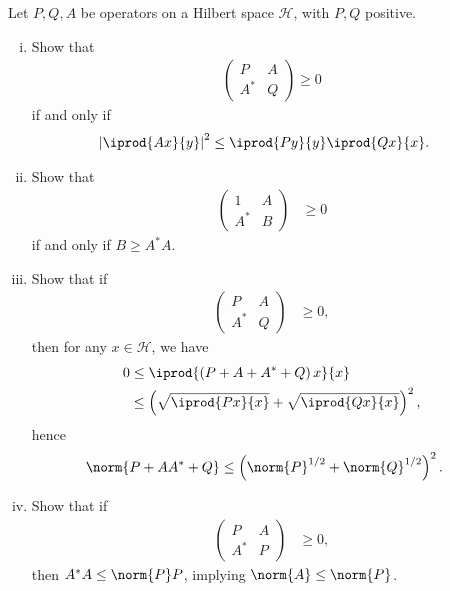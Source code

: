 \documentclass[10pt]{mypackage}
\begin{document}
\begin{exercise}[Exercise 3.2]
  Let $P,Q,A$ be operators on a Hilbert space $\mathcal{H}$, with $P,Q$ positive.
  \begin{enumerate}[(i)]
    \item Show that
      \begin{align*}
        \begin{pmatrix}P & A \\ A^{\ast} & Q\end{pmatrix}\geq 0
      \end{align*}
      if and only if
      \begin{align*}
        \left\vert \iprod{Ax}{y} \right\vert^2 &\leq \iprod{Py}{y} \iprod{Qx}{x}.
      \end{align*}
    \item Show that
      \begin{align*}
        \begin{pmatrix}1 & A \\ A^{\ast} & B\end{pmatrix} &\geq 0
      \end{align*}
      if and only if $B\geq A^{\ast}A$.
    \item Show that if
      \begin{align*}
        \begin{pmatrix}P & A \\ A^{\ast} & Q\end{pmatrix} &\geq 0,
      \end{align*}
      then for any $x\in \mathcal{H}$, we have
      \begin{align*}
        0 &\leq \iprod{\left( P + A + A^{\ast} + Q \right)x}{x}\\
          &\leq \left( \sqrt{ \iprod{Px}{x} } + \sqrt{ \iprod{Qx}{x} }\right) ^2,
      \end{align*}
      hence
      \begin{align*}
        \norm{P + AA^{\ast} + Q} &\leq \left( \norm{P}^{1/2} + \norm{Q}^{1/2} \right)^2.
      \end{align*}
    \item Show that if
      \begin{align*}
        \begin{pmatrix}P & A \\ A^{\ast} & P\end{pmatrix} &\geq 0,
      \end{align*}
      then $A^{\ast}A \leq \norm{P}P$, implying $\norm{A}\leq \norm{P}$.
  \end{enumerate}
\end{exercise}
\end{document}

